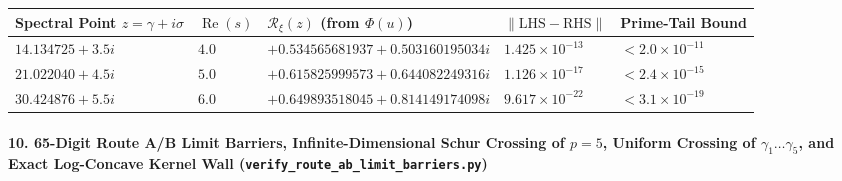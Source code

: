 \documentclass[
  11pt,
]{article}
\newcounter{none} %
\begin{document}
\begin{enumerate}
  {\def\LTcaptype{none} %
  \begin{longtable}[]{@{}
    >{\raggedright\arraybackslash}p{}
    >{\centering\arraybackslash}p{}
    >{\centering\arraybackslash}p{}
    >{\centering\arraybackslash}p{}
    >{\centering\arraybackslash}p{}@{}}
  \toprule\noalign{}
  \begin{minipage}[b]{\linewidth}\raggedright
  Spectral Point \(z = \gamma + i\sigma\)
  \end{minipage} & \begin{minipage}[b]{\linewidth}\centering
  \(\operatorname{Re}(s)\)
  \end{minipage} & \begin{minipage}[b]{\linewidth}\centering
  \(\mathcal{R}_\xi(z)\) (from \(\Phi(u)\))
  \end{minipage} & \begin{minipage}[b]{\linewidth}\centering
  \(\|\text{LHS} - \text{RHS}\|\)
  \end{minipage} & \begin{minipage}[b]{\linewidth}\centering
  Prime-Tail Bound
  \end{minipage} \\
  \midrule\noalign{}
  \endhead
  \bottomrule\noalign{}
  \endlastfoot
  \(14.134725 + 3.5i\) & \(4.0\) & \(+0.534565681937 + 0.503160195034i\)
  & \textbf{\(1.425 \times 10^{-13}\)} & \(< 2.0 \times 10^{-11}\) \\
  \(21.022040 + 4.5i\) & \(5.0\) & \(+0.615825999573 + 0.644082249316i\)
  & \textbf{\(1.126 \times 10^{-17}\)} & \(< 2.4 \times 10^{-15}\) \\
  \(30.424876 + 5.5i\) & \(6.0\) & \(+0.649893518045 + 0.814149174098i\)
  & \textbf{\(9.617 \times 10^{-22}\)} & \(< 3.1 \times 10^{-19}\) \\
  \end{longtable}
  }
\end{enumerate}

\paragraph{\texorpdfstring{10. 65-Digit Route A/B Limit Barriers,
Infinite-Dimensional Schur Crossing of \(p = 5\), Uniform Crossing of
\(\gamma_1 \dots \gamma_5\), and Exact Log-Concave Kernel Wall
(\texttt{verify\_route\_ab\_limit\_barriers.py})}{10. 65-Digit Route A/B Limit Barriers, Infinite-Dimensional Schur Crossing of p = 5, Uniform Crossing of \textbackslash gamma\_1 \textbackslash dots \textbackslash gamma\_5, and Exact Log-Concave Kernel Wall (verify\_route\_ab\_limit\_barriers.py)}}\label{digit-route-ab-limit-barriers-infinite-dimensional-schur-crossing-of-p-5-uniform-crossing-of-gamma_1-dots-gamma_5-and-exact-log-concave-kernel-wall-verify_route_ab_limit_barriers.py}
\end{document}
